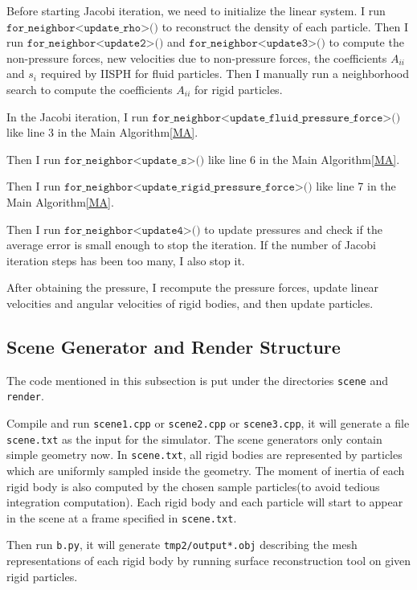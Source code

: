 \documentclass[acmlarge]{acmart}
\begin{document}
Before starting Jacobi iteration, we need to initialize the linear system. I run $\texttt{for\_neighbor<update\_rho>()}$ to 
reconstruct the density of each particle. 
Then I run $\texttt{for\_neighbor<update2>()}$ and $\texttt{for\_neighbor<update3>()}$
to compute the non-pressure forces, new velocities due to non-pressure forces, 
the coefficients $A_{ii}$ and $s_i$ required by IISPH for fluid particles.
Then I manually run a neighborhood search to compute the coefficients $A_{ii}$ for rigid particles.

In the Jacobi iteration, I run $\texttt{for\_neighbor<update\_fluid\_pressure\_force>()}$ like line 3 in the Main Algorithm\ref{MA}.

Then I run $\texttt{for\_neighbor<update\_s>()}$ like line 6 in the Main Algorithm\ref{MA}.

Then I run $\texttt{for\_neighbor<update\_rigid\_pressure\_force>()}$ like line 7 in the Main Algorithm\ref{MA}.

Then I run $\texttt{for\_neighbor<update4>()}$ to update pressures and check if the average error is small enough to stop the iteration.
If the number of Jacobi iteration steps has been too many, I also stop it.

After obtaining the pressure, I recompute the pressure forces, update linear velocities and angular velocities of rigid bodies,
and then update particles.

\subsection{Scene Generator and Render Structure}

The code mentioned in this subsection is put under the directories \texttt{scene} and \texttt{render}.

Compile and run \texttt{scene1.cpp} or \texttt{scene2.cpp} or \texttt{scene3.cpp}, it will generate a file \texttt{scene.txt} as the input for the simulator.
The scene generators only contain simple geometry now. In \texttt{scene.txt}, all rigid bodies are represented by particles which are uniformly sampled inside 
the geometry. The moment of inertia of each rigid body is also computed by the chosen sample particles(to avoid tedious integration computation).
Each rigid body and each particle will start to appear in the scene at a frame specified in \texttt{scene.txt}.

Then run \texttt{b.py}, it will generate \texttt{tmp2/output*.obj} describing the mesh representations of each rigid body by running 
surface reconstruction tool on given rigid particles.
\end{document}
